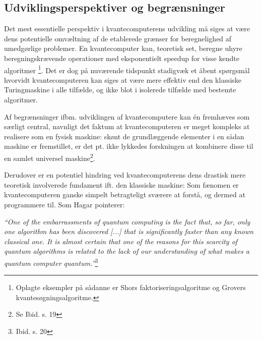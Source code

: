 \documentclass[10pt,a4paper]{article}
\newcommand{\citat}[2]{\begin{justify}\textit{``#1''}\hspace{0.1cm}\footnote{#2}\end{justify}}
\begin{document}
\subsection{Udviklingsperspektiver og begrænsninger}
Det mest essentielle perspektiv i kvantecomputerens udvikling må siges at være
dens potentielle omvæltning af de etablerede grænser for beregnelighed af
umedgørlige problemer.  En kvantecomputer kan, teoretisk set, beregne uhyre
beregningskrævende operationer med eksponentielt speedup for visse kendte
algoritmer \footnote{Oplagte eksempler på sådanne er Shors
faktoriseringsalgoritme og Grovers kvantesøgningsalgoritme.}. Det er dog på
nuværende tidspunkt stadigvæk et åbent spørgsmål hvorvidt kvantecomputeren kan
siges at være mere effektiv end den klassiske Turingmaskine i alle tilfælde, og
ikke blot i isolerede tilfælde med bestemte algoritmer. 

Af begrænsninger ifbm. udviklingen af kvantecomputere kan én fremhæves som særligt
central, navnligt det faktum at kvantecomputeren er meget kompleks at realisere 
som en fysisk maskine: skønt de grundlæggende elementer i en sådan maskine er 
fremstillet, er det pt. ikke lykkedes forskningen at kombinere disse til en samlet
universel maskine\footnote{Se Ibid. s. 19}.

Derudover er en potentiel hindring ved kvantecomputerens dens drastisk mere 
teoretisk involverede fundament ift. den klassiske maskine:  
Som fænomen er kvantecomputeren ganske simpelt betragteligt sværere at forstå, 
og dermed at programmere til.
Som Hagar pointerer: 
\citat{One of the embarrassments of quantum computing is the fact that, so far, 
only one algorithm has been discovered [...] that is significantly faster than 
any \textit{known} classical one. It is almost certain that one of the reasons for
this scarcity of quantum algorithms is related to the lack of our understanding
of what makes a quantum computer quantum.}{Ibid. s. 20}
\end{document}

